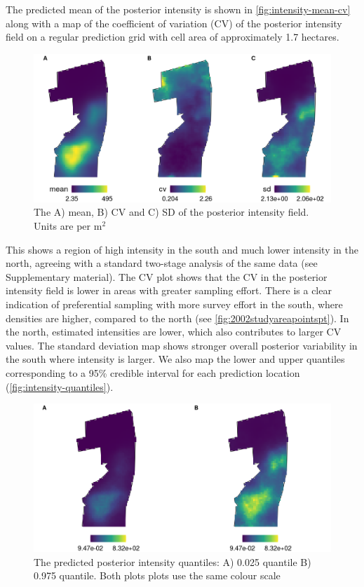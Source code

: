 \documentclass{stylefile16/statsoc}
\begin{document}
The predicted mean of the posterior intensity is shown in \autoref{fig:intensity-mean-cv} along with a map of the coefficient of variation (CV) of the posterior intensity field on a regular prediction grid with cell area of approximately 1.7 hectares.
\begin{figure}[!htb]
	\begin{center}
		\includegraphics[scale=0.525]{figures/intensity_mean_cv_sd.png}
		\caption{The A) mean, B) CV and C) SD of the posterior intensity field.  Units are per m$^2$}
		\label{fig:intensity-mean-cv}
	\end{center}
\end{figure}
This shows a region of high intensity in the south and much lower intensity in the north, agreeing with a standard two-stage analysis of the same data (see Supplementary material).  The CV plot shows that the CV in the posterior intensity field is lower in areas with greater sampling effort.  There is a clear indication of preferential sampling with more survey effort in the south, where densities are higher, compared to the north  (see \autoref{fig:2002studyareapointspt}).  In the north, estimated intensities are lower, which also contributes to larger CV values.  The standard deviation map shows stronger overall posterior variability in the south where intensity is larger.  We also map the lower and upper quantiles corresponding to a 95\% credible interval for each prediction location (\autoref{fig:intensity-quantiles}).
\begin{figure}[!htb]
	\begin{center}
		\includegraphics[scale=0.525]{figures/intensity_quantiles.png}
		\caption{The predicted posterior intensity quantiles:  A) 0.025 quantile B) 0.975 quantile.  Both plots plots use the same colour scale}
		\label{fig:intensity-quantiles}
	\end{center}
\end{figure}
\end{document}
